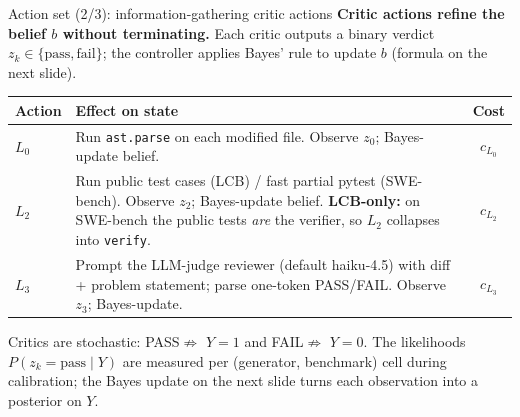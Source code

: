 \documentclass[10pt]{beamer}
\newcommand{\warn}[1]{\textcolor{accentOrange}{\textbf{#1}}}
\newcommand{\info}[1]{\textcolor{primaryBlue}{\textbf{#1}}}
\begin{document}
\begin{frame}{Action set (2/3): information-gathering critic actions}
\info{Critic actions refine the belief $b$ without terminating.} Each critic
outputs a binary verdict $z_k \in \{\text{pass},\text{fail}\}$; the
controller applies Bayes' rule to update $b$ (formula on the next slide).

\vspace{0.15cm}
\begin{table}
\centering
\small
\begin{tabular}{>{\ttfamily}lp{7.0cm}c}
\toprule
\rowcolor{paleBlue}\textnormal{\textbf{Action}} & \textnormal{\textbf{Effect on state}} & \textnormal{\textbf{Cost}} \\
\midrule
$L_0$    & Run \texttt{ast.parse} on each modified file. Observe
           $z_0$; Bayes-update belief. & $c_{L_0}$ \\
\addlinespace[4pt]
$L_2$    & Run public test cases (LCB) / fast partial pytest (SWE-bench).
           Observe $z_2$; Bayes-update belief. \warn{LCB-only:} on SWE-bench
           the public tests \emph{are} the verifier, so $L_2$ collapses
           into \texttt{verify}. & $c_{L_2}$ \\
\addlinespace[4pt]
$L_3$    & Prompt the LLM-judge reviewer (default haiku-4.5) with diff +
           problem statement; parse one-token PASS/FAIL. Observe $z_3$;
           Bayes-update. & $c_{L_3}$ \\
\bottomrule
\end{tabular}
\end{table}

\vspace{0.25cm}
\textcolor{softGrey}{\scriptsize Critics are stochastic: PASS$\not\Rightarrow$
$Y{=}1$ and FAIL$\not\Rightarrow$ $Y{=}0$. The likelihoods
$P(z_k{=}\text{pass}\mid Y)$ are measured per (generator, benchmark) cell
during calibration; the Bayes update on the next slide turns each
observation into a posterior on $Y$.}
\end{frame}
\end{document}
